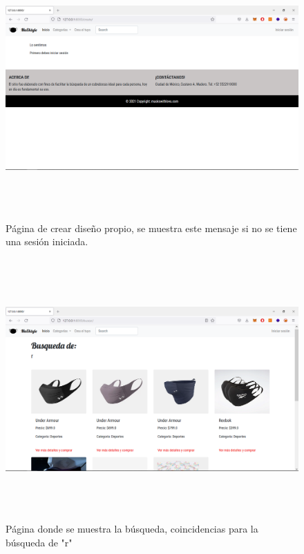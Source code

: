 \documentclass[letterpaper,12pt]{article}
\begin{document}
\begin{figure}[H]
	\includegraphics[width=18cm, height=10cm]{5}
	\centering
	\caption{Página de crear diseño propio, se muestra este mensaje si no se tiene una sesión iniciada.}
\end{figure}
\begin{figure}[H]
	\includegraphics[width=18cm, height=10cm]{6}
	\centering
	\caption{Página donde se muestra la búsqueda, coincidencias para la búsqueda de "r"}
\end{figure}
\end{document}
